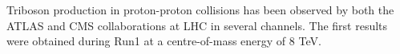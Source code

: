 %
%
%
%
%
%

Triboson production in proton-proton collisions has been observed by both the ATLAS and CMS collaborations at LHC in several channels.
The first results were obtained during Run1 at a centre-of-mass energy of 8 TeV.

